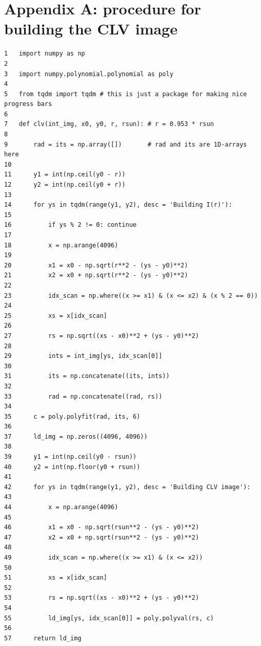 \documentclass[paper=a4, fontsize=11pt]{article}
\numberwithin{equation}{section}
\numberwithin{figure}{section}
\numberwithin{table}{section}
\begin{document}
\section{Appendix A: procedure for building the CLV image}
\small
\begin{verbatim}
1   import numpy as np
2
3   import numpy.polynomial.polynomial as poly
4
5   from tqdm import tqdm # this is just a package for making nice progress bars
6
7   def clv(int_img, x0, y0, r, rsun): # r = 0.953 * rsun
8 
9       rad = its = np.array([])       # rad and its are 1D-arrays here
10 
11      y1 = int(np.ceil(y0 - r))
12      y2 = int(np.ceil(y0 + r))
13 
14      for ys in tqdm(range(y1, y2), desc = 'Building I(r)'):
15 
16          if ys % 2 != 0: continue
17 
18          x = np.arange(4096)
19
20          x1 = x0 - np.sqrt(r**2 - (ys - y0)**2)
21          x2 = x0 + np.sqrt(r**2 - (ys - y0)**2)
22
23          idx_scan = np.where((x >= x1) & (x <= x2) & (x % 2 == 0))
24
25          xs = x[idx_scan]
26
27          rs = np.sqrt((xs - x0)**2 + (ys - y0)**2)
28
29          ints = int_img[ys, idx_scan[0]]
30 
31          its = np.concatenate((its, ints))
32 
33          rad = np.concatenate((rad, rs))
34 
35      c = poly.polyfit(rad, its, 6)
36 
37      ld_img = np.zeros((4096, 4096))
38 
39      y1 = int(np.ceil(y0 - rsun))
40      y2 = int(np.floor(y0 + rsun))
41 
42      for ys in tqdm(range(y1, y2), desc = 'Building CLV image'):
43
44          x = np.arange(4096)
45 
46          x1 = x0 - np.sqrt(rsun**2 - (ys - y0)**2)
47          x2 = x0 + np.sqrt(rsun**2 - (ys - y0)**2)
48 
49          idx_scan = np.where((x >= x1) & (x <= x2))
50 
51          xs = x[idx_scan]
52 
53          rs = np.sqrt((xs - x0)**2 + (ys - y0)**2)
54 
55          ld_img[ys, idx_scan[0]] = poly.polyval(rs, c)
56 
57      return ld_img
\end{verbatim}

\clearpage
\end{document}
